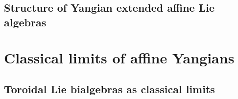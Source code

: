             \minitoc
        
           
    
           

           
    
        \newpage
    
        \chapter{Structure of Yangian extended affine Lie algebras} \label{chapter: yangian_EALAs}
            \begin{abstract}
                In this chapter, we attempt to construct , which are to be extensions $\extendedtoroidal$ of a certain Lie algebra of derivations by the toroidal Lie algebra $\toroidal := \uce(\g[v^{\pm 1}, t^{\pm 1}])$. This is to rectify the problem whereby any invariant symmetric bilinear form on $\toroidal$ is necessarily degenerate, which can result in difficulties both when dealing with the representation theory of $\toroidal$ itself and when we study  later on in chapter \ref{chapter: classical_limits_of_affine_yangians}.
            \end{abstract}
    
            \minitoc
        
            
    
            
    
            
    
        \newpage

    \part{Classical limits of affine Yangians} 
        \chapter{Toroidal Lie bialgebras as classical limits} \label{chapter: classical_limits_of_affine_yangians}
            \begin{abstract}
                
            \end{abstract}
    
            \minitoc

            
    
            
    
            

    \newpage

    \printbibliography

